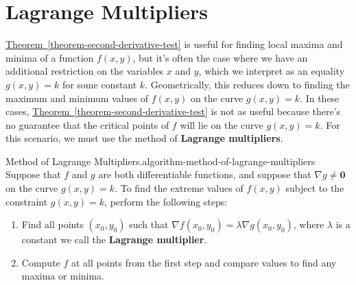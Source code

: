 \documentclass[10pt,]{book}
\newcommand{\terminology}[1]{\textbf{#1}}
\numberwithin{equation}{section}
\newcommand{\vv}[1]{\mathbf{#1}}
\newcommand{\grad}{\nabla}
\begin{document}
\section[{Lagrange Multipliers}]{Lagrange Multipliers}\label{section-lagrange-multipliers}
\hypertarget{p-1440}{}%
\hyperref[theorem-second-derivative-test]{Theorem~\ref{theorem-second-derivative-test}} is useful for finding local maxima and minima of a function \(f(x,y)\), but it's often the case where we have an additional restriction on the variables \(x\) and \(y\), which we interpret as an equality \(g(x,y) = k\) for some constant \(k\). Geometrically, this reduces down to finding the maximum and minimum values of \(f(x,y)\) on the curve \(g(x,y) = k\). In these cases, \hyperref[theorem-second-derivative-test]{Theorem~\ref{theorem-second-derivative-test}} is not as useful because there's no guarantee that the critical points of \(f\) will lie on the curve \(g(x,y) = k\). For this scenario, we must use the method of \terminology{Lagrange multipliers}.%
\begin{algorithm}{Method of Lagrange Multipliers.}{}{algorithm-method-of-lagrange-multipliers}%
\hypertarget{p-1441}{}%
Suppose that \(f\) and \(g\) are both differentiable functions, and suppose that \(\grad g\neq\vv{0}\) on the curve \(g(x,y) = k\). To find the extreme values of \(f(x,y)\) subject to the constraint \(g(x,y) = k\), perform the following steps: \leavevmode%
\begin{enumerate}
\item\hypertarget{li-141}{}Find all points \((x_{0},y_{0})\) such that \(\grad f(x_{0},y_{0}) = \lambda \grad g(x_{0},y_{0})\), where \(\lambda\) is a constant we call the \terminology{Lagrange multiplier}.%
\item\hypertarget{li-142}{}Compute \(f\) at all points from the first step and compare values to find any maxima or minima.%
\end{enumerate}
%
\end{algorithm}
\end{document}
